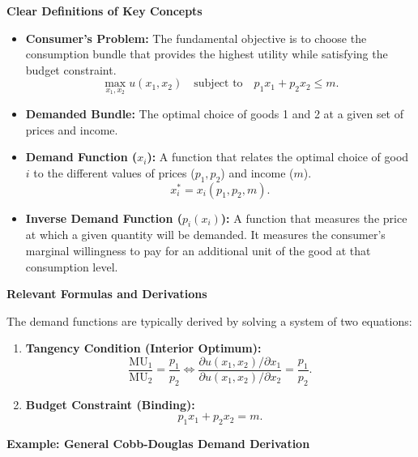 \documentclass{article}
\begin{document}
\vspace{1em}
\noindent\textbf{Clear Definitions of Key Concepts}
\begin{itemize}
    \item \textbf{Consumer's Problem:} The fundamental objective is to choose the consumption bundle that provides the highest utility while satisfying the budget constraint. \[\max_{x_1, x_2} u(x_1, x_2) \quad \text{subject to} \quad p_1 x_1 + p_2 x_2 \leq m.\]
    \item \textbf{Demanded Bundle:} The optimal choice of goods 1 and 2 at a given set of prices and income.
    \item \textbf{Demand Function ($x_i$):} A function that relates the optimal choice of good $i$ to the different values of prices ($p_1, p_2$) and income ($m$). \[x_i^* = x_i(p_1, p_2, m).\]
    \item \textbf{Inverse Demand Function ($p_i(x_i)$):} A function that measures the price at which a given quantity will be demanded. It measures the consumer's marginal willingness to pay for an additional unit of the good at that consumption level.
\end{itemize}

\vspace{1em}
\noindent\textbf{Relevant Formulas and Derivations}
\vspace{0.5em}

\noindent The demand functions are typically derived by solving a system of two equations:
\begin{enumerate}
    \item \textbf{Tangency Condition (Interior Optimum):} \[\frac{\text{MU}_1}{\text{MU}_2} = \frac{p_1}{p_2} \iff \frac{\partial u(x_1, x_2)/\partial x_1}{\partial u(x_1, x_2)/\partial x_2} = \frac{p_1}{p_2}.\]
    \item \textbf{Budget Constraint (Binding):} \[p_1 x_1 + p_2 x_2 = m.\]
\end{enumerate}

\vspace{1em}
\noindent\textbf{Example: General Cobb-Douglas Demand Derivation}
\vspace{0.5em}
\end{document}
